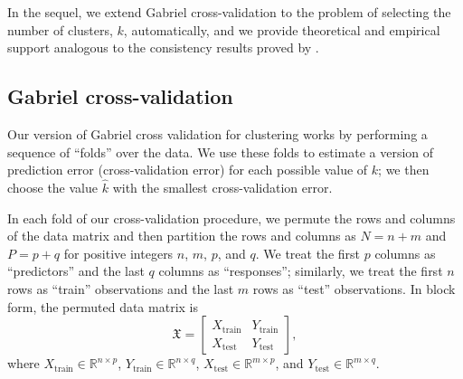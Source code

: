 \documentclass[12pt]{article}
\newcommand{\R}{\mathbb{R}}
\newcommand{\dataX}{\mathfrak{X}}
\newcommand{\Xtrain}{X_{\text{train}}}
\newcommand{\Ytrain}{Y_{\text{train}}}
\newcommand{\Xtest}{X_{\text{test}}}
\newcommand{\Ytest}{Y_{\text{test}}}
\begin{document}
In the sequel, we extend Gabriel cross-validation to the problem of selecting
the number of clusters, $k$, automatically, and we provide theoretical and
empirical support analogous to the consistency results proved by
\citet{owen2009bi}.


\subsection{Gabriel cross-validation}
\label{sec:gabriel-cv-algorithm}


Our version of Gabriel cross validation for clustering works by performing a
sequence of ``folds'' over the data. We use these folds to estimate a version
of prediction error (cross-validation error) for each possible value of $k$;
we then choose the value $\hat k$ with the smallest cross-validation error.


In each fold of our cross-validation procedure, we permute the rows and
columns of the data matrix and then partition the rows and columns as $N = n +
m$ and $P = p + q$ for positive integers $n$, $m$, $p$, and $q$.  We treat
the first $p$ columns as ``predictors'' and the last $q$ columns as
``responses''; similarly, we treat the first $n$ rows as ``train''
observations and the last $m$ rows as ``test'' observations.  In block form,
the permuted data matrix is
\[
  \dataX
  =
  \begin{bmatrix}
    \Xtrain & \Ytrain \\
    \Xtest  & \Ytest
  \end{bmatrix},
\]
where
$\Xtrain \in \R^{n \times p}$,
$\Ytrain \in \R^{n \times q}$,
$\Xtest \in  \R^{m \times p}$,
and
$\Ytest \in  \R^{m \times q}$.
\end{document}
